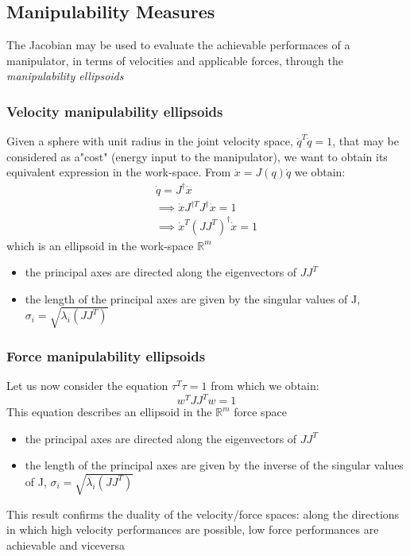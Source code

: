 \documentclass{book}
\begin{document}
\subsection{Manipulability Measures}
The Jacobian may be used to evaluate the achievable performaces of a manipulator, in terms of velocities and applicable forces, through the \emph{manipulability ellipsoids}
\subsubsection{Velocity manipulability ellipsoids}
Given a sphere with unit radius in the joint velocity space, $\dot{q}^T\dot{q}=1$, that may be considered as a"cost" (energy input to the manipulator), we want to obtain its equivalent expression in the work-space. From $\dot{x}=J(q)\dot{q}$ we obtain:
\begin{gather*}
    \dot{q}=J^\dagger \dot{x}\\
    \implies \dot{x} J^{\dagger T}J^\dagger\dot{x}=1\\
    \implies \dot{x}^T(JJ^T)^\dagger\dot{x}=1
\end{gather*}
which is an ellipsoid in the work-space $\mathbb{R}^m$
\begin{itemize}
    \item the principal axes are directed along the eigenvectors of $JJ^T$
    \item the length of the principal axes are given by the singular values of J, $\sigma_i=\sqrt{\lambda_i(JJ^T)}$
\end{itemize}
\subsubsection{Force manipulability ellipsoids}
Let us now consider the equation $\tau^T\tau=1$ from which we obtain:
\[
    w^TJJ^Tw=1
\]
This equation describes an ellipsoid in the $\mathbb{R}^m$ force space
\begin{itemize}
    \item the principal axes are directed along the eigenvectors of $JJ^T$
    \item the length of the principal axes are given by the inverse of the singular values of J, $\sigma_i=\sqrt{\lambda_i(JJ^T)}$
\end{itemize}
This result confirms the duality of the velocity/force spaces: along the directions in which high velocity performances are possible, low force performances are achievable and viceversa
\end{document}
